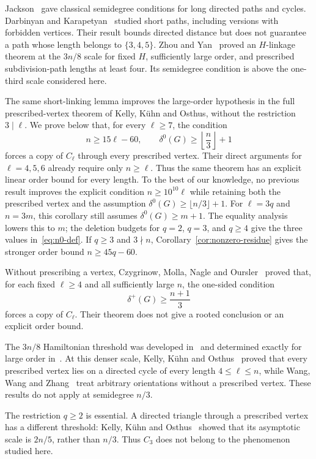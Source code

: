\documentclass[11pt]{amsart}
\theoremstyle{definition}
\begin{document}
Jackson~\cite{Jackson} gave classical semidegree conditions for long
directed paths and cycles.  Darbinyan and Karapetyan~\cite{DK} studied
short paths, including versions with forbidden vertices.  Their result
bounds directed distance but does not guarantee a path whose length
belongs to $\{3,4,5\}$.  Zhou and Yan~\cite{ZY} proved an $H$-linkage
theorem at the $3n/8$ scale for fixed $H$, sufficiently large order,
and prescribed subdivision-path lengths at least four.  Its semidegree
condition is above the one-third scale considered here.

The same short-linking lemma improves the large-order hypothesis in the
full prescribed-vertex theorem of Kelly, K\"uhn and Osthus, without the
restriction $3\mid\ell$.  We prove below that, for every $\ell\ge7$,
the condition
\[
  n\ge15\ell-60,
  \qquad
  \delta^0(G)\ge\left\lfloor\frac n3\right\rfloor+1
\]
forces a copy of $C_\ell$ through every prescribed vertex.  Their direct
arguments for $\ell=4,5,6$ already require only $n\ge\ell$.  Thus the
same theorem has an explicit linear order bound for every length.
To the best of our knowledge, no previous result improves the explicit
condition $n\ge10^{10}\ell$ while retaining both the prescribed vertex
and the assumption
$\delta^0(G)\ge\lfloor n/3\rfloor+1$.
For $\ell=3q$ and $n=3m$, this corollary still assumes
$\delta^0(G)\ge m+1$.  The equality analysis lowers this to $m$; the
deletion budgets for $q=2$, $q=3$, and $q\ge4$ give the three values
in~\eqref{eq:n0-def}.  If $q\ge3$ and $3\nmid n$,
Corollary~\ref{cor:nonzero-residue} gives the stronger order bound
$n\ge45q-60$.

Without prescribing a vertex, Czygrinow, Molla, Nagle and
Oursler~\cite{CMNO} proved that, for each fixed $\ell\ge4$ and all
sufficiently large $n$, the one-sided condition
\[
  \delta^+(G)\ge\frac{n+1}{3}
\]
forces a copy of $C_\ell$.  Their theorem does not give a rooted
conclusion or an explicit order bound.

The $3n/8$ Hamiltonian threshold was developed
in~\cite{Hag,KKOdirac} and determined exactly for large order
in~\cite{KKOexact}.  At this denser scale, Kelly, K\"uhn and
Osthus~\cite{KKO} proved that every prescribed vertex lies
on a directed cycle of every length $4\le \ell\le n$, while Wang,
Wang and Zhang~\cite{WWZ} treat arbitrary
orientations without a prescribed vertex.  These results do not apply
at semidegree $n/3$.

The restriction $q\ge2$ is essential.  A directed triangle through a
prescribed vertex has a different threshold: Kelly, K\"uhn and
Osthus~\cite{KKO} showed that its asymptotic scale is
$2n/5$, rather than $n/3$.  Thus $C_3$ does not belong to the phenomenon
studied here.
\end{document}
